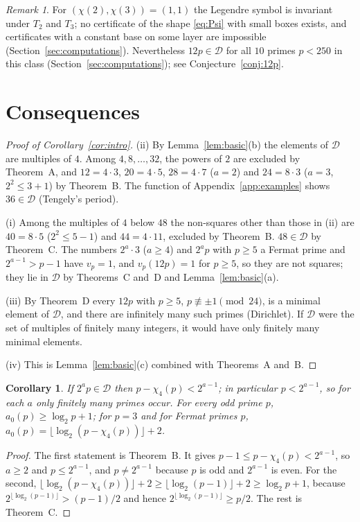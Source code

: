 \documentclass[11pt,a4paper]{article}
\newtheorem{corollary}[theorem]{Corollary}
\theoremstyle{definition}
\theoremstyle{remark}
\newtheorem{remark}[theorem]{Remark}
\newcommand{\cD}{\mathcal{D}}
\begin{document}
\begin{remark}
For $(\chi(2),\chi(3))=(1,1)$ the Legendre symbol is invariant under $T_2$ and $T_3$; no certificate of the shape \eqref{eq:Psi} with small boxes exists, and certificates with a constant base on some layer are impossible (Section~\ref{sec:computations}). Nevertheless $12p\in\cD$ for all $10$ primes $p<250$ in this class (Section~\ref{sec:computations}); see Conjecture~\ref{conj:12p}.
\end{remark}

\section{Consequences}\label{sec:consequences}

\begin{proof}[Proof of Corollary~\ref{cor:intro}]
(ii) By Lemma~\ref{lem:basic}(b) the elements of $\cD$ are multiples of $4$. Among $4,8,\dots,32$, the powers of $2$ are excluded by Theorem~A, and $12=4\cdot3$, $20=4\cdot5$, $28=4\cdot7$ ($a=2$) and $24=8\cdot3$ ($a=3$, $2^2\le 3+1$) by Theorem~B. The function of Appendix~\ref{app:examples} shows $36\in\cD$ (Tengely's period).

(i) Among the multiples of $4$ below $48$ the non-squares other than those in (ii) are $40=8\cdot5$ ($2^2\le5-1$) and $44=4\cdot11$, excluded by Theorem~B. $48\in\cD$ by Theorem~C. The numbers $2^a\cdot3$ ($a\ge4$) and $2^ap$ with $p\ge5$ a Fermat prime and $2^{a-1}>p-1$ have $v_p=1$, and $v_p(12p)=1$ for $p\ge5$, so they are not squares; they lie in $\cD$ by Theorems~C and~D and Lemma~\ref{lem:basic}(a).

(iii) By Theorem~D every $12p$ with $p\ge5$, $p\not\equiv\pm1\pmod{24}$, is a minimal element of $\cD$, and there are infinitely many such primes (Dirichlet). If $\cD$ were the set of multiples of finitely many integers, it would have only finitely many minimal elements.

(iv) This is Lemma~\ref{lem:basic}(c) combined with Theorems~A and~B.
\end{proof}

\begin{corollary}\label{cor:fixeda}
If $2^ap\in\cD$ then $p-\chi_4(p)<2^{a-1}$; in particular $p<2^{a-1}$, so for each $a$ only finitely many primes occur. For every odd prime $p$, $a_0(p)\ge\log_2p+1$; for $p=3$ and for Fermat primes $p$, $a_0(p)=\lfloor\log_2(p-\chi_4(p))\rfloor+2$.
\end{corollary}

\begin{proof}
The first statement is Theorem~B. It gives $p-1\le p-\chi_4(p)<2^{a-1}$, so $a\ge2$ and $p\le2^{a-1}$, and $p\ne2^{a-1}$ because $p$ is odd and $2^{a-1}$ is even. For the second, $\lfloor\log_2(p-\chi_4(p))\rfloor+2\ge\lfloor\log_2(p-1)\rfloor+2\ge\log_2p+1$, because $2^{\lfloor\log_2(p-1)\rfloor}>(p-1)/2$ and hence $2^{\lfloor\log_2(p-1)\rfloor}\ge p/2$. The rest is Theorem~C.
\end{proof}
\end{document}
